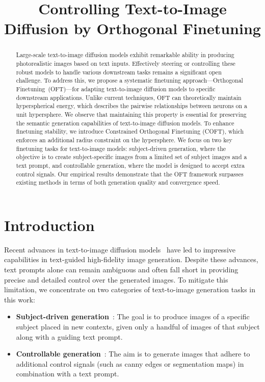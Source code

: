 \title{Controlling Text-to-Image Diffusion by Orthogonal Finetuning}

\begin{abstract}
Large-scale text-to-image diffusion models exhibit remarkable ability in producing photorealistic images based on text inputs. Effectively steering or controlling these robust models to handle various downstream tasks remains a significant open challenge. To address this, we propose a systematic finetuning approach—Orthogonal Finetuning~(OFT)—for adapting text-to-image diffusion models to specific downstream applications. Unlike current techniques, OFT can theoretically maintain hyperspherical energy, which describes the pairwise relationships between neurons on a unit hypersphere. We observe that maintaining this property is essential for preserving the semantic generation capabilities of text-to-image diffusion models. To enhance finetuning stability, we introduce Constrained Orthogonal Finetuning (COFT), which enforces an additional radius constraint on the hypersphere. We focus on two key finetuning tasks for text-to-image models: subject-driven generation, where the objective is to create subject-specific images from a limited set of subject images and a text prompt, and controllable generation, where the model is designed to accept extra control signals. Our empirical results demonstrate that the OFT framework surpasses existing methods in terms of both generation quality and convergence speed.
\end{abstract}

\section{Introduction}

Recent advances in text-to-image diffusion models~\cite{saharia2022photorealistic,ramesh2022hierarchical,rombach2022high} have led to impressive capabilities in text-guided high-fidelity image generation. Despite these advances, text prompts alone can remain ambiguous and often fall short in providing precise and detailed control over the generated images. To mitigate this limitation, we concentrate on two categories of text-to-image generation tasks in this work:

\begin{itemize}[leftmargin=*,nosep]

    \item \textbf{Subject-driven generation}~\cite{ruiz2023dreambooth}: The goal is to produce images of a specific subject placed in new contexts, given only a handful of images of that subject along with a guiding text prompt.
    \item \textbf{Controllable generation}~\cite{zhang2023adding,mou2023t2i}: The aim is to generate images that adhere to additional control signals (such as canny edges or segmentation maps) in combination with a text prompt.
\end{itemize}

